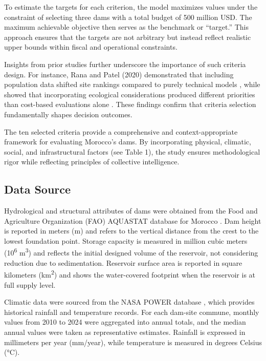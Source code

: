 To estimate the targets for each criterion, the model maximizes values under the constraint of selecting three dams with a total budget of 500 million USD. The maximum achievable objective then serves as the benchmark or “target.” This approach ensures that the targets are not arbitrary but instead reflect realistic upper bounds within fiscal and operational constraints.

Insights from prior studies further underscore the importance of such criteria design. For instance, Rana and Patel (2020) demonstrated that including population data shifted site rankings compared to purely technical models \cite{Rana2020}, while \cite{TEMEL2023159152} showed that incorporating ecological considerations produced different priorities than cost-based evaluations alone . These findings confirm that criteria selection fundamentally shapes decision outcomes.

The ten selected criteria provide a comprehensive and context-appropriate framework for evaluating Morocco’s dams. By incorporating physical, climatic, social, and infrastructural factors (see Table 1), the study ensures methodological rigor while reflecting principles of collective intelligence.

\subsection{Data Source}
Hydrological and structural attributes of dams were obtained from the Food and Agriculture Organization (FAO) AQUASTAT database for Morocco \cite{FAO_AQUASTAT_MAR}. Dam height is reported in meters (m) and refers to the vertical distance from the crest to the lowest foundation point. Storage capacity is measured in million cubic meters (10\textsuperscript{6} m\textsuperscript{3}) and reflects the initial designed volume of the reservoir, not considering reduction due to sedimentation. Reservoir surface area is reported in square kilometers (km\textsuperscript{2}) and shows the water-covered footprint when the reservoir is at full supply level.

Climatic data were sourced from the NASA POWER database \cite{NASA_POWER_API}, which provides historical rainfall and temperature records. For each dam-site commune, monthly values from 2010 to 2024 were aggregated into annual totals, and the median annual values were taken as representative estimates. Rainfall is expressed in millimeters per year (mm/year), while temperature is measured in degrees Celsius (°C).

